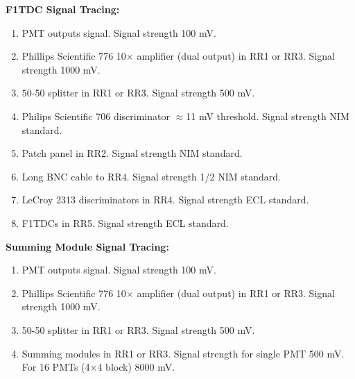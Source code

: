 \documentclass[10pt]{article}
\begin{document}
\noindent \textbf{F1TDC Signal Tracing:}
	\begin{enumerate}
		\item PMT outputs signal. Signal strength 100 mV.
		\item Phillips Scientific 776 10$\times$ amplifier (dual output) in RR1 or RR3. Signal strength 1000 mV.
		\item 50-50 splitter in RR1 or RR3. Signal strength 500 mV.
		\item Philips Scientific 706 discriminator $\approx$11 mV threshold. Signal strength NIM standard.
		\item Patch panel in RR2. Signal strength NIM standard.
		\item Long BNC cable to RR4. Signal strength 1/2 NIM standard.
		\item LeCroy 2313 discriminators in RR4. Signal strength ECL standard.
		\item F1TDCs in RR5. Signal strength ECL standard.
	\end{enumerate}
	
\noindent \textbf{Summing Module Signal Tracing:}
	\begin{enumerate}
		\item PMT outputs signal. Signal strength 100 mV.
		\item Phillips Scientific 776 10$\times$ amplifier (dual output) in RR1 or RR3. Signal strength 1000 mV.
		\item 50-50 splitter in RR1 or RR3. Signal strength 500 mV.
		\item Summing modules in RR1 or RR3. Signal strength for single PMT 500 mV. For 16 PMTs (4$\times$4 block) 8000 mV.
	\end{enumerate}
	
\end{document}
